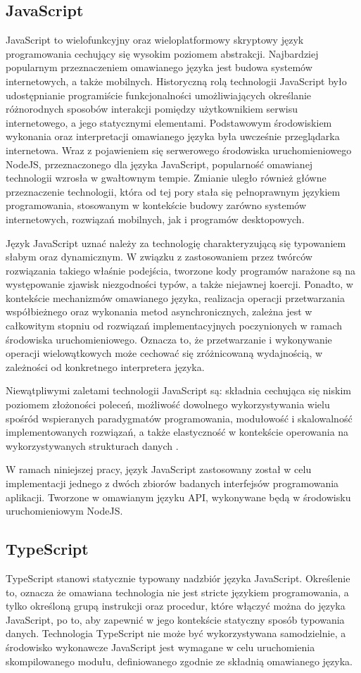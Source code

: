 \subsection*{JavaScript}
JavaScript to wielofunkcyjny oraz wieloplatformowy skryptowy język programowania cechujący się wysokim poziomem abstrakcji. Najbardziej popularnym przeznaczeniem omawianego języka jest budowa systemów internetowych, a także mobilnych. Historyczną rolą technologii JavaScript było udostępnianie programiście funkcjonalności umożliwiających określanie różnorodnych sposobów interakcji pomiędzy użytkownikiem serwisu internetowego, a jego statycznymi elementami. Podstawowym środowiskiem wykonania oraz interpretacji omawianego języka była uwcześnie przeglądarka internetowa. Wraz z pojawieniem się serwerowego środowiska uruchomieniowego NodeJS, przeznaczonego dla języka JavaScript, popularność omawianej technologii wzrosła w gwałtownym tempie. Zmianie uległo również główne przeznaczenie technologii, która od tej pory stała się pełnoprawnym językiem programowania, stosowanym w kontekście budowy zarówno systemów internetowych, rozwiązań mobilnych, jak i programów desktopowych.

Język JavaScript uznać należy za technologię charakteryzującą się typowaniem słabym oraz dynamicznym. W związku z zastosowaniem przez twórców rozwiązania takiego właśnie podejścia, tworzone kody programów narażone są na występowanie zjawisk niezgodności typów, a także niejawnej koercji. Ponadto, w kontekście mechanizmów omawianego języka, realizacja operacji przetwarzania współbieżnego oraz wykonania metod asynchronicznych, zależna jest w całkowitym stopniu od rozwiązań implementacyjnych poczynionych w ramach środowiska uruchomieniowego. Oznacza to, że przetwarzanie i wykonywanie operacji wielowątkowych może cechować się zróżnicowaną wydajnością, w zależności od konkretnego interpretera języka.  

Niewątpliwymi zaletami technologii JavaScript są: składnia cechująca się niskim poziomem złożoności poleceń, możliwość dowolnego wykorzystywania wielu spośród wspieranych paradygmatów programowania, modułowość i skalowalność implementowanych rozwiązań, a także elastyczność w kontekście operowania na wykorzystywanych strukturach danych \cite{jensen2009type}.

W ramach niniejszej pracy, język JavaScript zastosowany został w celu implementacji jednego z dwóch zbiorów badanych interfejsów programowania aplikacji. Tworzone w omawianym języku API, wykonywane będą w środowisku uruchomieniowym NodeJS.
\subsection*{TypeScript}
TypeScript stanowi statycznie typowany nadzbiór języka JavaScript. Określenie to, oznacza że omawiana technologia nie jest stricte językiem programowania, a tylko określoną grupą instrukcji oraz procedur, które włączyć można do języka JavaScript, po to, aby zapewnić w jego kontekście statyczny sposób typowania danych. Technologia TypeScript nie może być wykorzystywana samodzielnie, a środowisko wykonawcze JavaScript jest wymagane w celu uruchomienia skompilowanego modułu, definiowanego zgodnie ze składnią omawianego języka.


